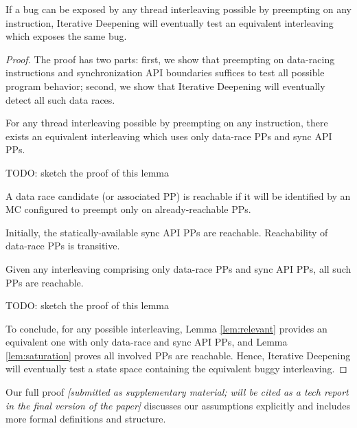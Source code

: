\begin{theorem}
If a bug can be exposed by any thread interleaving possible by preempting on any instruction,
Iterative Deepening will eventually test an equivalent interleaving which exposes the same bug.
\end{theorem}
\begin{proof}
The proof has two parts:
first, we show that preempting on data-racing instructions and synchronization API boundaries suffices to test all possible program behavior;
second, we show that Iterative Deepening will eventually detect all such data races.

\begin{lemma}
For any thread interleaving possible by preempting on any instruction,
there exists an equivalent interleaving which uses only data-race PPs and sync API PPs.
	\label{lem:relevant}
\end{lemma}

TODO: sketch the proof of this lemma %

\begin{definition}
A data race candidate (or associated PP) is reachable if it will be identified by an MC configured to preempt only on already-reachable PPs.
\end{definition}
Initially, the statically-available sync API PPs are reachable. Reachability of data-race PPs is transitive.
\begin{lemma}
	Given any interleaving comprising only data-race PPs and sync API PPs, all such PPs are reachable.
	\label{lem:saturation}
\end{lemma}

TODO: sketch the proof of this lemma %

To conclude,
for any possible interleaving, Lemma \ref{lem:relevant} provides an equivalent one with only data-race and sync API PPs,
and Lemma \ref{lem:saturation} proves all involved PPs are reachable.
Hence, Iterative Deepening will eventually test a state space containing the equivalent buggy interleaving.
\end{proof}

Our full proof
{\em [submitted as supplementary material; will be cited as a tech report in the final version of the paper]}
discusses our assumptions explicitly and includes more formal definitions and structure.


